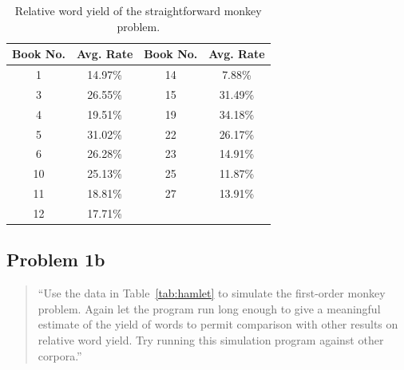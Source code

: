 \documentclass[conference]{IEEEtran}
\begin{document}
\begin{table}[htb]
\caption{Relative word yield of the straightforward monkey problem.\label{tab:problem1a}}
\vspace{-10pt}
\begin{center}
\begin{tabular}{cccc}
\hline
Book No. & Avg. Rate & Book No. & Avg. Rate \\
\hline
1  & 14.97\% & 14 & 7.88\% \\
3  & 26.55\% & 15 & 31.49\% \\
4  & 19.51\% & 19 & 34.18\% \\
5  & 31.02\% & 22 & 26.17\% \\
6  & 26.28\% & 23 & 14.91\% \\
10 & 25.13\% & 25 & 11.87\% \\
11 & 18.81\% & 27 & 13.91\% \\
12 & 17.71\% & & \\
\hline
\end{tabular}
\end{center}
\end{table}


\subsection{Problem 1b}

\begin{quote}
``Use the data in Table~\ref{tab:hamlet} to simulate the first-order monkey problem. 
Again let the program run long enough to give a meaningful estimate of the yield of words to permit comparison with other results on relative word yield. 
Try running this simulation program against other corpora.''
\end{quote}
\vspace{0.75em}
\end{document}
